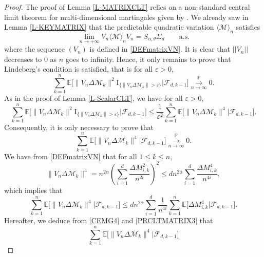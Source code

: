 \documentclass[twoside,12pt]{article}
\newcommand{\dP}{\mathbb{P}}
\newcommand{\cM}{\mathcal{M}}
\newcommand{\cF}{\mathcal{F}}
\newcommand{\veps}{\varepsilon}
\newcommand{\rI}{\mathrm{I}}
\newcommand{\E}{\mathds{E}}
\begin{document}
\begin{proof}
The proof of Lemma \ref{L-MATRIXCLT} relies on a non-standard central limit theorem for multi-dimensional martingales given by \citep[Theorem 1]{Tou(91)}. We already saw in Lemma \ref{L-KEYMATRIX} that the predictable quadratic variation
$\langle \cM\rangle_{n}$ satisfies
\begin{equation}
\label{PRCLTMATRIX1}
\lim_{n\rightarrow+\infty}V_{n}\langle \cM\rangle_{n}V_{n}= S_{\alpha,\theta} \Sigma_d \qquad\text{a.s.}
\end{equation}
where the sequence $(V_n)$ is defined in \eqref{DEFmatrixVN}. It is clear that $||V_n||$ decreases to $0$ as $n$ goes to infinity. Hence, it only remains to prove that Lindeberg’s condition is satisfied, that is for all $\varepsilon >0$, 
\begin{equation*}
 \sum_{k=1}^n \E\bigl[\|V_n \Delta \cM_k \|^2 \rI_{\{\|V_n\Delta \cM_k \|>\veps\}}\bigl|\cF_{d,k-1}\bigr] \overset{\displaystyle \dP}{\underset{n\to\infty}{\longrightarrow}}   0.
\end{equation*}
As in the proof of Lemma \ref{L-ScalarCLT}, we have for all $\varepsilon >0$,
$$
\sum_{k=1}^n \E\bigl[\|V_n \Delta \cM_k \|^2 \rI_{\{\|V_n\Delta \cM_k \|>\veps\}}\bigl|\cF_{d,k-1}\bigr]
\leq 
\frac{1}{\varepsilon^2}
\sum_{k=1}^n \E\bigl[\|V_n \Delta \cM_k \|^4 \bigl|\cF_{d,k-1}\bigr].
$$
Consequently, it is only necessary to prove that
\begin{equation}
\label{PRCLTMATRIX2}
\sum_{k=1}^{n}
\E\bigl[\|V_n \Delta \cM_k \|^4 \bigl|\cF_{d,k-1}\bigr] \overset{\displaystyle \dP}{\underset{n\to\infty}{\longrightarrow}} 0.
\end{equation}
We have from \eqref{DEFmatrixVN} that for all $1 \leq k \leq n$,
\begin{equation*}
\|V_n \Delta \cM_k \|^4 =n^{2\alpha} \left(\sum_{i=1}^d \frac{\Delta M_{i,k}^2}{n^{2i}}\right)^2
\leq d n^{2\alpha} \sum_{i=1}^d \frac{\Delta M_{i,k}^4}{n^{4i}},
\end{equation*}
which implies that
\begin{equation}
\label{PRCLTMATRIX3}
\sum_{k=1}^{n}
\E\bigl[\|V_n \Delta \cM_k \|^4 \bigl|\cF_{d,k-1}\bigr] \leq
d n^{2\alpha} \sum_{i=1}^d \frac{1}{n^{4i}} \sum_{k=1}^{n} \E\bigl[\Delta M_{i,k}^4 \bigl|\cF_{d,k-1}\bigr].
\end{equation}
Hereafter, we deduce from \eqref{CEMG4} and \eqref{PRCLTMATRIX3} that
\begin{equation*}
\sum_{k=1}^{n}
\E\bigl[\|V_n \Delta \cM_k \|^4 \bigl|\cF_{d,k-1}\bigr] 

\end{equation*}
\end{proof}
\end{document}
